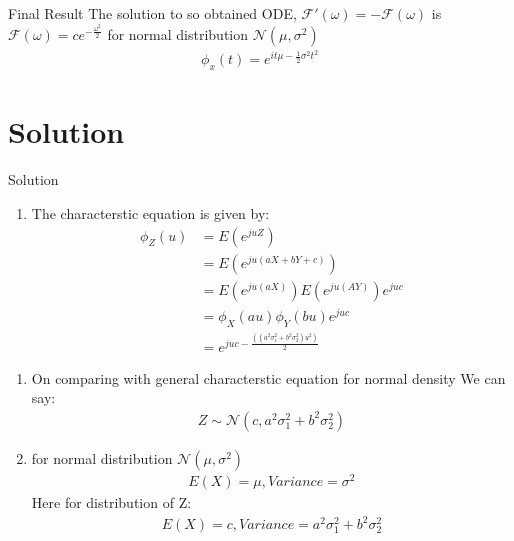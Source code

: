 \documentclass{beamer}
\providecommand{\e}[1]{\ensuremath{E\left(#1\right)}}
\providecommand{\brak}[1]{\ensuremath{\left(#1\right)}}
\newcounter{saveenumi}
\newcommand{\seti}{\setcounter{saveenumi}{\value{enumi}}}
\newcommand{\conti}{\setcounter{enumi}{\value{saveenumi}}}
\begin{document}
\begin{frame}{}
\begin{block}{Final Result}
The solution to so obtained ODE, $\mathcal{F}'\brak{\omega}=-\mathcal{F}\brak{\omega}$ is\\$\mathcal{F}\brak{\omega}=ce^{-\frac{\omega^2}{2}}$
for normal distribution $\mathcal{N}\brak{\mu,\sigma^2}$ 
\begin{align}
\phi_x\brak{t}=e^{it\mu-\frac{1}{2}\sigma^2t^2}
\end{align}
\end{block}
\end{frame}
\section{Solution}
\begin{frame}{Solution}
\begin{enumerate}
\item The characterstic equation is given by:
\begin{align}
\phi_Z \brak{u} &=\e{e^{juZ}} \\
                &=\e{e^{ju(aX+bY+c)}} \\
                &=\e{e^{ju(aX)}}\e{e^{ju(AY)}}e^{juc} \\
                &=\phi_X \brak{au}\phi_Y \brak{bu}e^{juc} \\
                &=e^{juc-\frac{\brak{(a^2\sigma_1^2+b^2\sigma_2^2)u^2}}{2}}
\end{align}
\seti
\end{enumerate}
\end{frame}{}
\begin{enumerate}
\conti
\item On comparing with  general characterstic equation for normal density We can say: 
\begin{align}
Z \sim \mathcal{N}\brak{c,a^2\sigma_1^2+b^2\sigma_2^2}
\end{align}
\item for normal distribution $\mathcal{N}\brak{\mu,\sigma^2}$ 
\begin{align}
\e{X}=\mu,Variance=\sigma^2
\end{align}
Here for distribution of Z:
\begin{align}
\e{X}=c,Variance=a^2\sigma_1^2+b^2\sigma_2^2
\end{align}
\end{enumerate}
\end{document}
